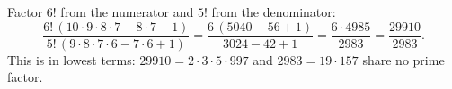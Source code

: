 Factor $6!$ from the numerator and $5!$ from the denominator:
\[
\dfrac{6!\,(10\cdot9\cdot8\cdot7-8\cdot7+1)}{5!\,(9\cdot8\cdot7\cdot6-7\cdot6+1)}=\dfrac{6\,(5040-56+1)}{3024-42+1}=\dfrac{6\cdot4985}{2983}=\boxed{\dfrac{29910}{2983}}.
\]
This is in lowest terms: $29910=2\cdot3\cdot5\cdot997$ and $2983=19\cdot157$ share no prime factor.
